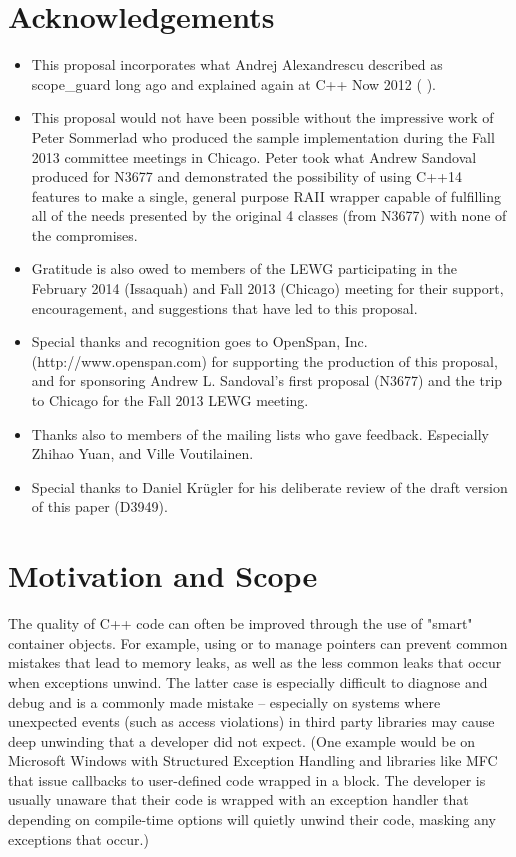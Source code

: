 \documentclass[ebook,11pt,article]{memoir}
\begin{document}
\chapter{Acknowledgements}
\begin{itemize}
\item This proposal incorporates what Andrej Alexandrescu described as scope_guard long ago and explained again at C++ Now 2012 (%
).
\item This proposal would not have been possible without the impressive work of Peter Sommerlad who produced the sample implementation during the Fall 2013 committee meetings in Chicago.  Peter took what Andrew Sandoval produced for N3677 and demonstrated the possibility of using C++14 features to make a single, general purpose RAII wrapper capable of fulfilling all of the needs presented by the original 4 classes (from N3677) with none of the compromises.
\item Gratitude is also owed to members of the LEWG participating in the February 2014 (Issaquah) and Fall 2013 (Chicago) meeting for their support, encouragement, and suggestions that have led to this proposal.
\item Special thanks and recognition goes to OpenSpan, Inc. (http://www.openspan.com) for supporting the production of this proposal, and for sponsoring Andrew L. Sandoval's first proposal (N3677) and the trip to Chicago for the Fall 2013 LEWG meeting.
\item Thanks also to members of the mailing lists who gave feedback. Especially Zhihao Yuan, and Ville Voutilainen.
\item Special thanks to Daniel Krügler for his deliberate review of the draft version of this paper (D3949).
\end{itemize}

\chapter{Motivation and Scope}
The quality of C++ code can often be improved through the use of "smart" container objects.  For example, using  or  to manage pointers can prevent common mistakes that lead to memory leaks, as well as the less common leaks that occur when exceptions unwind.  The latter case is especially difficult to diagnose and debug and is a commonly made mistake -- especially on systems where unexpected events (such as access violations) in third party libraries may cause deep unwinding that a developer did not expect.  (One example would be on Microsoft Windows with Structured Exception Handling and libraries like MFC that issue callbacks to user-defined code wrapped in a  block.  The developer is usually unaware that their code is wrapped with an exception handler that depending on compile-time options will quietly unwind their code, masking any exceptions that occur.)
\end{document}
